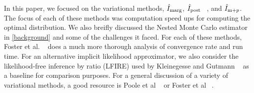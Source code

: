 In this paper, we focused on the variational methods, $\hat{I}_{\text{marg}}$, $\hat{I}_{\text{post}}$
~\cite{agakov2004algorithm}, and $\hat{I}_{\text{m}+p}$. The focus of each of these methods was 
computation speed ups for computing the optimal distribution. We also breifly 
discussed the Nested Monte Carlo estimator in \SEC\ref{background} and some of 
the challenges it faced. For each of these methods, Foster et al. 
~\cite{Foster2019} does a much more thorough analysis of convergence rate and 
run time. For an alternative implicit likelihood approximator, we also consider 
the likelihood-free inference by ratio (LFIRE) used by Kleinegesse and Gutmann 
~\cite{kleinegesse2021sequential} as a baseline for comparison purposes. For 
a general discussion of a variety of variational methods, a good resource is 
Poole et al ~\cite{poole2019variational} or Foster et al ~\cite{foster2020unified}.




